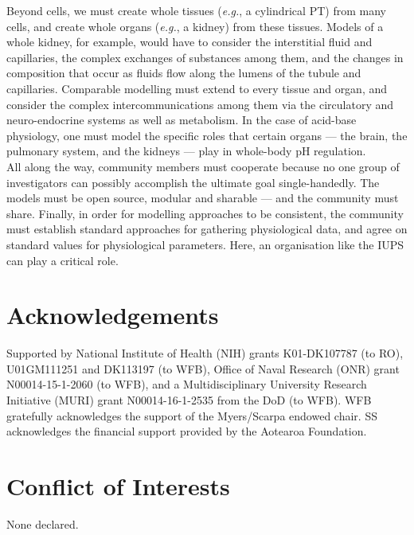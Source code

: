 \documentclass[fleqn,10pt]{physiome}
\begin{document}
Beyond cells, we must create whole tissues (\emph{e.g.}, a cylindrical PT) from many cells, and create whole organs (\emph{e.g.}, a kidney) from these tissues. Models of a whole kidney, for example, would have to consider the interstitial fluid and capillaries, the complex exchanges of substances among them, and the changes in composition that occur as fluids flow along the lumens of the tubule and capillaries. Comparable modelling must extend to every tissue and organ, and consider the complex intercommunications among them via the circulatory and neuro-endocrine systems as well as metabolism. In the case of acid-base physiology, one must model the specific roles that certain organs --- the brain, the pulmonary system, and the kidneys --- play in whole-body $\mathrm{pH}$ regulation.\\

All along the way, community members must cooperate because no one group of investigators can possibly accomplish the ultimate goal single-handedly. The models must be open source, modular and sharable --- and the community must share. Finally, in order for modelling approaches to be consistent, the community must establish standard approaches for gathering physiological data, and agree on standard values for physiological parameters. Here, an organisation like the IUPS can play a critical role.\\


\section{Acknowledgements}

Supported by National Institute of Health (NIH) grants K01-DK107787 (to RO), U01GM111251 and DK113197 (to WFB), Office of Naval Research (ONR) grant N00014-15-1-2060 (to WFB), and a Multidisciplinary University Research Initiative (MURI) grant N00014-16-1-2535 from the DoD (to WFB). WFB gratefully acknowledges the support of the Myers/Scarpa endowed chair. SS acknowledges the financial support provided by the Aotearoa Foundation.

\section{Conflict of Interests}

None declared.


\end{document}
